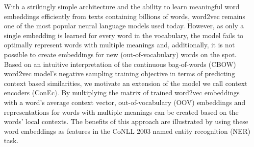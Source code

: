 With a strikingly simple architecture and the ability to learn meaningful word embeddings efficiently from texts containing billions of words, word2vec remains one of the most popular neural language models used today. However, as only a single embedding is learned for every word in the vocabulary, the model fails to optimally represent words with multiple meanings and, additionally, it is not possible to create embeddings for new (out-of-vocabulary) words on the spot. Based on an intuitive interpretation of the continuous bag-of-words (CBOW) word2vec model's negative sampling training objective in terms of predicting context based similarities, we motivate an extension of the model we call context encoders (ConEc). By multiplying the matrix of trained word2vec embeddings with a word's average context vector, out-of-vocabulary (OOV) embeddings and representations for words with multiple meanings can be created based on the words' local contexts. The benefits of this approach are illustrated by using these word embeddings as features in the CoNLL 2003 named entity recognition (NER) task.
